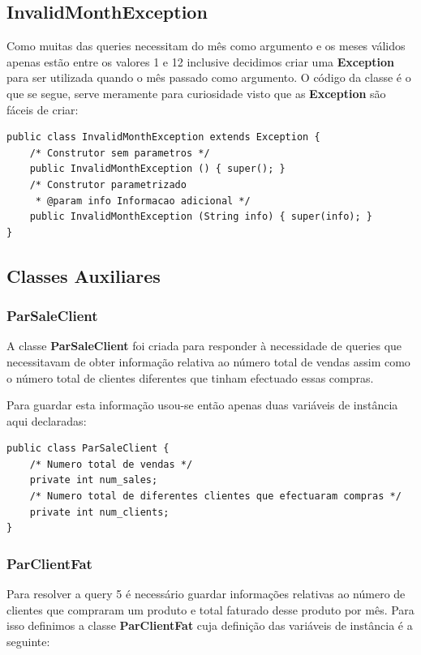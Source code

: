 \documentclass[10pt] {article}
\begin{document}
\subsection{InvalidMonthException}
\par Como muitas das queries necessitam do mês como argumento e os meses válidos apenas estão entre os valores 1 e 12 
inclusive decidimos criar uma \color{blue} \textbf{Exception} \color{black} para ser utilizada quando o mês passado como 
argumento. O código da classe é o que se segue, serve meramente para curiosidade visto que as \color{blue} 
\textbf{Exception} \color{black} são fáceis de criar:

\begin{lstlisting}
public class InvalidMonthException extends Exception {
	/* Construtor sem parametros */
	public InvalidMonthException () { super(); }
	/* Construtor parametrizado
	 * @param info Informacao adicional */
	public InvalidMonthException (String info) { super(info); }
}
\end{lstlisting}

\subsection{Classes Auxiliares}
\subsubsection{ParSaleClient}

A classe \color{blue} \textbf{ParSaleClient} \color{black} foi criada para responder à necessidade de queries que necessitavam de obter informação relativa ao número total de vendas assim como o número total de clientes diferentes que tinham efectuado essas compras.

Para guardar esta informação usou-se então apenas duas variáveis de instância aqui declaradas:

\begin{lstlisting}
public class ParSaleClient {
	/* Numero total de vendas */
	private int num_sales;
	/* Numero total de diferentes clientes que efectuaram compras */
	private int num_clients;
}
\end{lstlisting}

\subsubsection{ParClientFat}

Para resolver a query 5 é necessário guardar informações relativas ao número de clientes que compraram um produto e total faturado desse produto por mês. Para isso definimos a classe \color{blue} \textbf{ParClientFat} \color{black} cuja definição das variáveis de
instância é a seguinte:
\end{document}
